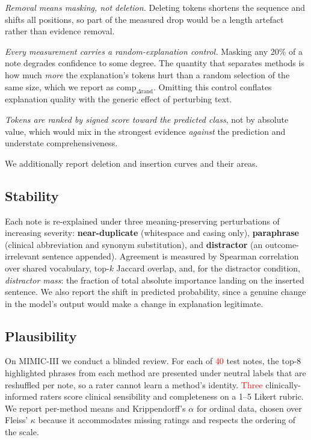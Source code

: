 \documentclass[conference]{IEEEtran}
\newif\ifdraftnums\draftnumstrue   %
\newcommand{\ph}[1]{\ifdraftnums\textcolor{red}{#1}\else#1\fi}
\begin{document}
\emph{Removal means masking, not deletion.} Deleting tokens shortens the sequence
and shifts all positions, so part of the measured drop would be a length artefact
rather than evidence removal.

\emph{Every measurement carries a random-explanation control.} Masking any 20\%
of a note degrades confidence to some degree. The quantity that separates methods
is how much \emph{more} the explanation's tokens hurt than a random selection of
the same size, which we report as $\mathrm{comp}_{\Delta\text{rand}}$. Omitting
this control conflates explanation quality with the generic effect of perturbing
text.

\emph{Tokens are ranked by signed score toward the predicted class}, not by
absolute value, which would mix in the strongest evidence \emph{against} the
prediction and understate comprehensiveness.

We additionally report deletion and insertion curves and their areas.

\subsection{Stability}\label{sec:stability}
Each note is re-explained under three meaning-preserving perturbations of
increasing severity: \textbf{near-duplicate} (whitespace and casing only),
\textbf{paraphrase} (clinical abbreviation and synonym substitution), and
\textbf{distractor} (an outcome-irrelevant sentence appended). Agreement is
measured by Spearman correlation over shared vocabulary, top-$k$ Jaccard overlap,
and, for the distractor condition, \emph{distractor mass}: the fraction of total
absolute importance landing on the inserted sentence. We also report the shift in
predicted probability, since a genuine change in the model's output would make a
change in explanation legitimate.

\subsection{Plausibility}\label{sec:plausibility}
On MIMIC-III we conduct a blinded review. For each of \ph{40} test notes, the
top-8 highlighted phrases from each method are presented under neutral labels
that are reshuffled per note, so a rater cannot learn a method's identity.
\ph{Three} clinically-informed raters score clinical sensibility and completeness
on a 1--5 Likert rubric. We report per-method means and Krippendorff's $\alpha$
for ordinal data, chosen over Fleiss' $\kappa$ because it accommodates missing
ratings and respects the ordering of the scale.
\end{document}
